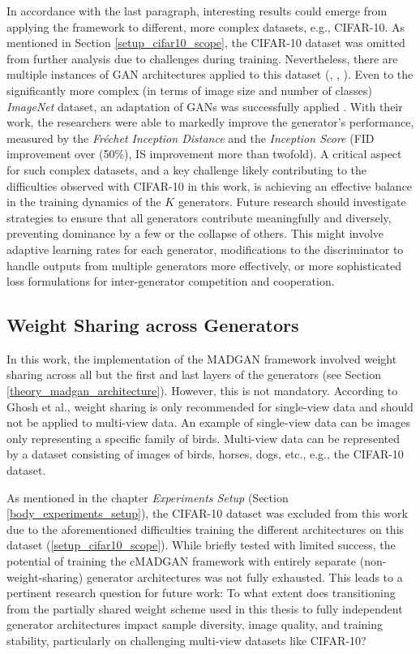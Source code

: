 In accordance with the last paragraph, interesting results could emerge from applying the framework to different, more complex datasets, e.g., CIFAR-10. As mentioned in Section \ref{setup_cifar10_scope}, the CIFAR-10 dataset was omitted from further analysis due to challenges during training. Nevertheless, there are multiple instances of GAN architectures applied to this dataset (\cite{salimans2016improvedtechniquestraininggans}, \cite{denton2015deepgenerativeimagemodels}, \cite{gong2019autoganneuralarchitecturesearch}). Even to the significantly more complex (in terms of image size and number of classes) \textit{ImageNet} dataset, an adaptation of GANs was successfully applied \cite{brock2019largescalegantraining}. With their work, the researchers were able to markedly improve the generator's performance, measured by the \textit{Fréchet Inception Distance} and the \textit{Inception Score} (FID improvement over (50\%), IS improvement more than twofold). A critical aspect for such complex datasets, and a key challenge likely contributing to the difficulties observed with CIFAR-10 in this work, is achieving an effective balance in the training dynamics of the \(K\) generators. Future research should investigate strategies to ensure that all generators contribute meaningfully and diversely, preventing dominance by a few or the collapse of others. This might involve adaptive learning rates for each generator, modifications to the discriminator to handle outputs from multiple generators more effectively, or more sophisticated loss formulations for inter-generator competition and cooperation.


\subsection{Weight Sharing across Generators}
In this work, the implementation of the MADGAN framework involved weight sharing across all but the first and last layers of the generators (see Section \ref{theory_madgan_architecture}). However, this is not mandatory. According to Ghosh et al., weight sharing is only recommended for single-view data and should not be applied to multi-view data. An example of single-view data can be images only representing a specific family of birds. Multi-view data can be represented by a dataset consisting of images of birds, horses, dogs, etc., e.g., the CIFAR-10 dataset.

As mentioned in the chapter \textit{Experiments Setup} (Section \ref{body_experiments_setup}), the CIFAR-10 dataset was excluded from this work due to the aforementioned difficulties training the different architectures on this dataset (\ref{setup_cifar10_scope}). While briefly tested with limited success, the potential of training the cMADGAN framework with entirely separate (non-weight-sharing) generator architectures was not fully exhausted. This leads to a pertinent research question for future work: To what extent does transitioning from the partially shared weight scheme used in this thesis to fully independent generator architectures impact sample diversity, image quality, and training stability, particularly on challenging multi-view datasets like CIFAR-10?

